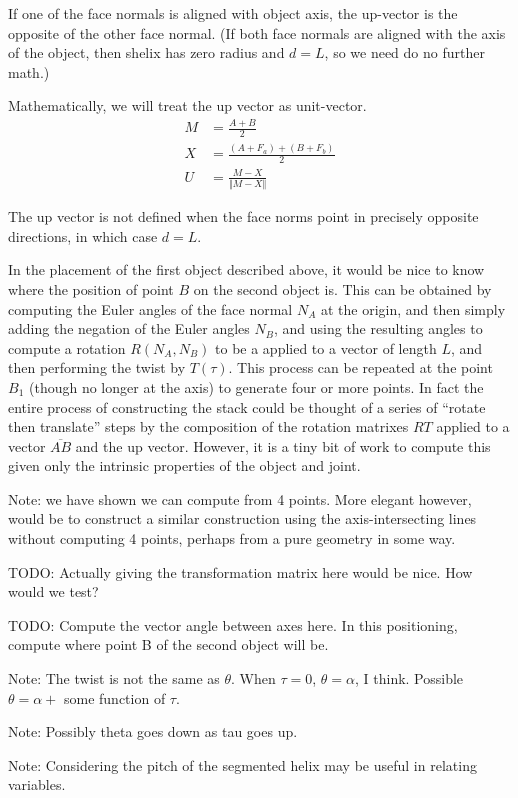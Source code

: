 \documentclass[11pt]{article}
\begin{document}
{If one of the face normals is aligned with object axis, the up-vector is the opposite
of the other face normal. (If both face normals are aligned with the axis of the object,
then shelix has zero radius and $d = L$, so we need do no further math.)

Mathematically, we will treat the up vector as unit-vector.
\begin{align}
  M &= \frac{A+B}{2} \\
  X &= \frac{(A+F_a) + (B+F_b)}{2} \\
  U &= \frac{M - X}{\Vert M - X \Vert}
\end{align}

The up vector is not defined when the face norms point in precisely opposite directions,
in which case $d = L$.

In the placement of the first object described above, it would
be nice to know where the position of point $B$ on the second
object is. This can be obtained by computing the Euler angles
of the face normal $N_A$ at the origin, and then simply
adding the negation of the Euler angles $N_B$, and using
the resulting angles to compute a rotation $R(N_A,N_B)$ to be a applied to
a vector of length $L$, and then performing the twist by $T(\tau)$. This process can be repeated at
the point $B_1$ (though no longer at the axis) to generate
four or more points. In fact the entire process of constructing
the stack could be thought of a series of ``rotate then translate'' steps by the composition of the rotation matrixes $RT$ applied to a vector $\overline{AB}$ and the up vector.
However, it is a tiny bit of work to compute this given only
the intrinsic properties of the object and joint.

Note: we have shown we can compute from 4 points.
More elegant however, would be to construct a similar
construction using the axis-intersecting lines without
computing 4 points, perhaps from a pure geometry in some way.

TODO: Actually giving the transformation matrix here would be nice.
How would we test? 

TODO: Compute the vector angle between axes here. In this positioning, compute where
point B of the second object will be.

Note: The twist is not the same as $\theta$. When $\tau = 0$, $\theta = \alpha$,
I think. Possible $\theta = \alpha + $ some function of $\tau$.

Note: Possibly theta goes down as tau goes up.

Note: Considering the pitch of the segmented helix may be useful
in relating variables.

}
\end{document}
